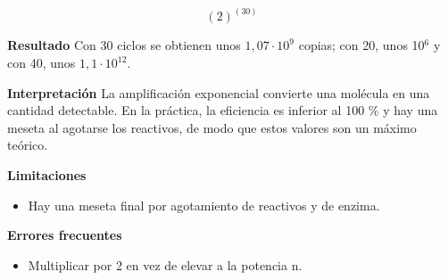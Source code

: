 \documentclass{book}
\begin{document}
\begin{tcolorbox}[title={Problema resuelto}, studiumworked, breakable]
\[
\left(2\right)^{\left(30\right)}
\]

\noindent\textbf{Resultado}
Con 30 ciclos se obtienen unos \(1,07\cdot10^{9}\) copias; con 20, unos 10\({}^{6}\) y con 40, unos \(1,1\cdot10^{12}\).


\noindent\textbf{Interpretación}
La amplificación exponencial convierte una molécula en una cantidad detectable. En la práctica, la eficiencia es inferior al 100 \% y hay una meseta al agotarse los reactivos, de modo que estos valores son un máximo teórico.


\noindent\textbf{Limitaciones}
\begin{itemize}
\item Hay una meseta final por agotamiento de reactivos y de enzima.
\end{itemize}

\noindent\textbf{Errores frecuentes}
\begin{itemize}
\item Multiplicar por 2 en vez de elevar a la potencia n.
\end{itemize}
\end{tcolorbox}
\end{document}
